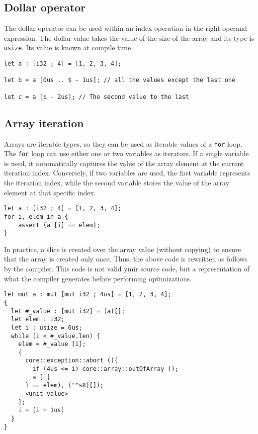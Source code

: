 \subsection {Dollar operator}

The dollar operator can be used within an index operation in the right operand
expression. The dollar value takes the value of the size of the array and its
type is \texttt{usize}. Its value is known at compile time.

\begin{lstlisting}[style=coloredverbatim]
let a : [i32 ; 4] = [1, 2, 3, 4];

let b = a [0us .. $ - 1us]; // all the values except the last one

let c = a [$ - 2us]; // The second value to the last
\end{lstlisting}

\subsection {Array iteration}

Arrays are iterable types, so they can be used as iterable values of a
\texttt{for} loop. The \texttt{for} loop can use either one or two variables as
iterators. If a single variable is used, it automatically captures the value of
the array element at the current iteration index. Conversely, if two variables
are used, the first variable represents the iteration index, while the second
variable stores the value of the array element at that specific index.

\begin{lstlisting}[style=coloredverbatim]
let a : [i32 ; 4] = [1, 2, 3, 4];
for i, elem in a {
    assert (a [i] == elem);
}
\end{lstlisting}

In practice, a slice is created over the array value (without copying) to ensure
that the array is created only once. Thus, the above code is rewritten as
follows by the compiler. This code is not valid ymir source code, but a
representation of what the compiler generates before performing optimizations.

\begin{lstlisting}[style=intermediateVerb]
let mut a : mut [mut i32 ; 4us] = [1, 2, 3, 4];
{
  let #_value : [mut i32] = (a)[];
  let elem : i32;
  let i : usize = 0us;
  while (i < #_value.len) {
    elem = #_value [i];
    {
      core::exception::abort (({
        if (4us <= i) core::array::outOfArray ();
        a [i]
      } == elem), (""s8)[]);
      <unit-value>
    };
    i = (i + 1us)
  }
}
\end{lstlisting}


